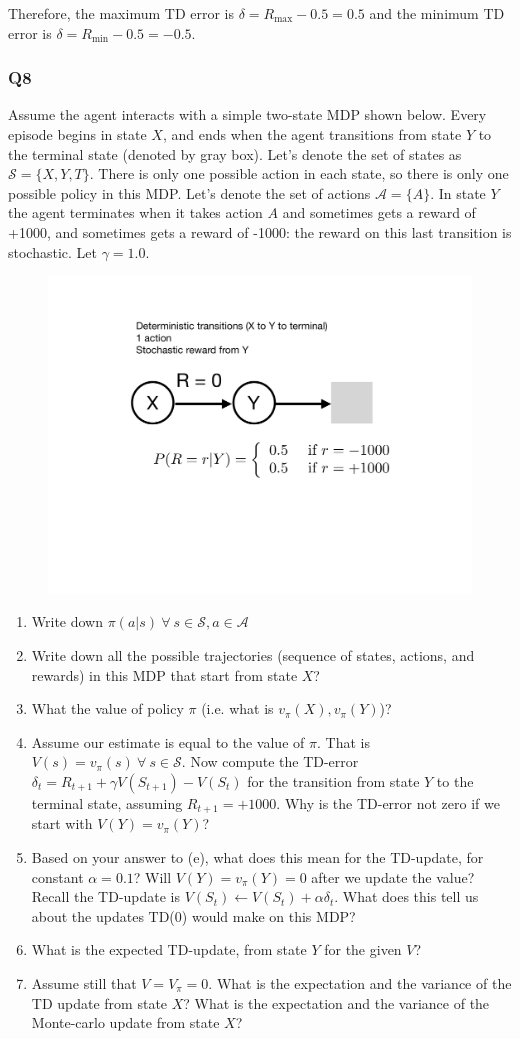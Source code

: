 \documentclass[a4paper, 10pt]{article}
\begin{document}
Therefore, the maximum TD error is $\delta = R_{\text{max}} - 0.5 = 0.5$ and the minimum TD error is $\delta = R_{\text{min}} - 0.5 = -0.5$.

\subsubsection*{Q8}
Assume the agent interacts with a simple two-state MDP shown below. Every episode begins in state $X$, and ends when the agent transitions from state $Y$ to the terminal state (denoted by gray box). Let's denote the set of states as $\mathcal{S} = \{X,Y,T\}$. There is only one possible action in each state, so there is only one possible policy in this MDP. Let's denote the set of actions $\mathcal{A} = \{A\}$. In state $Y$ the agent terminates when it takes action $A$ and sometimes gets a reward of +1000, and sometimes gets a reward of -1000: the reward on this last transition is stochastic. Let $\gamma = 1.0$. 
\begin{figure}[h!]
  \center
\includegraphics[width=0.5\linewidth]{figures/c2m2_xy.pdf}
\end{figure}
%
\begin{enumerate}
%
\item Write down $\pi(a|s) ~\forall~ s\in\mathcal{S}, a\in\mathcal{A}$
\item Write down all the possible trajectories (sequence of states, actions, and rewards) in this MDP that start from state $X$?
\item What the value of policy $\pi$ (i.e. what is $v_\pi(X), v_\pi(Y)$)?
\item Assume our estimate is equal to the value of $\pi$. That is $V(s) = v_\pi(s) ~\forall~ s\in\mathcal{S}$. Now compute the TD-error $\delta_t = R_{t+1} + \gamma V(S_{t+1}) - V(S_t)$ for the transition from state $Y$ to the terminal state, assuming $R_{t+1} = +1000$. Why is the TD-error not zero if we start with $V(Y) = v_\pi(Y)$?
\item Based on your answer to (e), what does this mean for the TD-update, for constant $\alpha = 0.1$? Will $V(Y) = v_\pi(Y) = 0$ after we update the value? Recall the TD-update is $V(S_t) \gets V(S_t) + \alpha \delta_t$.  What does this tell us about the updates TD(0) would make on this MDP?
\item What is the expected TD-update, from state $Y$ for the given $V$?
\item Assume still that $V=V_\pi = 0$. What is the expectation and the variance of the TD update from state $X$? What is the expectation and the variance of the Monte-carlo update from state $X$?
\end{enumerate}
\end{document}
